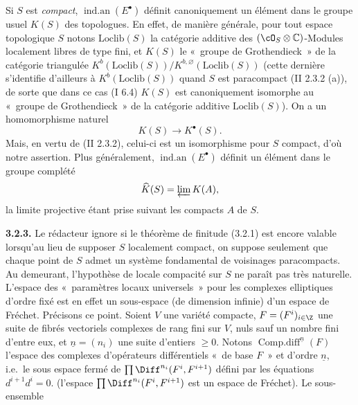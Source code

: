 Si $S$ est
\emph{compact}, $\operatorname{ind.an}(E^\bullet)$ définit canoniquement un élément dans le groupe usuel $K(S)$ des topologues. En effet, de manière générale, pour tout espace topologique $S$ notons $\mathrm{Loclib}(S)$ la catégorie additive des $(\cO_S\otimes\mathbb C)$-Modules localement libres de type fini, et $K(S)$ le «~groupe de Grothendieck~» de la catégorie triangulée $K^b(\mathrm{Loclib}(S))/K^{b,\varnothing}(\mathrm{Loclib}(S))$ (cette dernière s'identifie d'ailleurs à $K^b(\mathrm{Loclib}(S))$ quand $S$ est paracompact (II 2.3.2 (a)), de sorte que dans ce cas (I 6.4) $K(S)$ est canoniquement isomorphe au «~groupe de Grothendieck~» de la catégorie additive $\mathrm{Loclib}(S)$). On a un homomorphisme naturel
\[
  K(S)\longrightarrow K^\bullet(S).
\]
Mais, en vertu de (II 2.3.2), celui-ci est un isomorphisme pour $S$ compact, d'où notre assertion. Plus généralement, $\operatorname{ind.an}(E^\bullet)$ définit un élément dans le groupe complété
\[
  \widehat K(S)=\varprojlim K(A),
\]
la limite projective étant prise suivant les compacts $A$ de $S$.

\textbf{3.2.3.} Le rédacteur ignore si le théorème de finitude (3.2.1) est encore valable lorsqu'au lieu de supposer $S$ localement compact, on suppose seulement que chaque point de $S$ admet un système fondamental de voisinages paracompacts. Au demeurant, l'hypothèse de locale compacité sur $S$ ne paraît pas très naturelle. L'espace des «~paramètres locaux universels~» pour les complexes elliptiques d'ordre fixé est en effet un sous-espace (de dimension infinie) d'un espace de Fréchet. Précisons ce point. Soient $V$ une variété compacte, $F=(F^i)_{i\in\Z}$ une suite de fibrés vectoriels complexes de rang fini sur $V$, nuls sauf un nombre fini d'entre eux, et $\underline n=(n_i)$ une suite d'entiers $\geq 0$. Notons $\operatorname{Comp.diff}^{\underline n}(F)$ l'espace des complexes d'opérateurs différentiels «~de base $F$~» et d'ordre $\underline n$, i.e.\ le sous espace fermé de $\prod\Diff^{n_i}(F^i,F^{i+1})$ défini par les équations $d^{i+1}d^i=0$. (l'espace $\prod\Diff^{n_i}(F^i,F^{i+1})$ est un espace de Fréchet). Le sous-ensemble 
